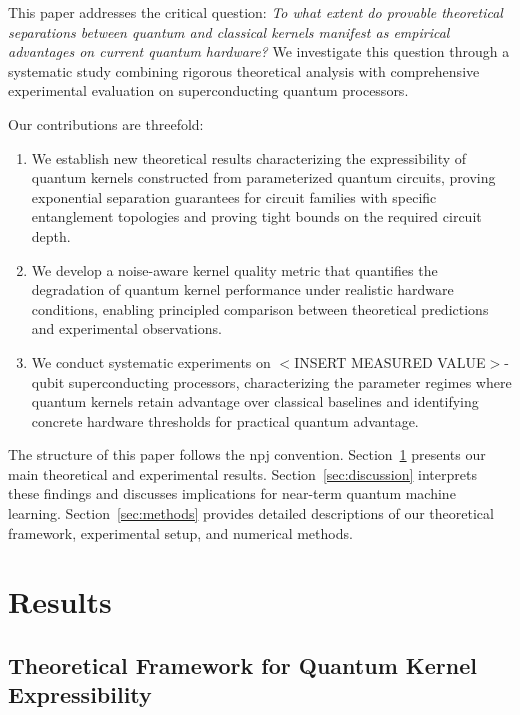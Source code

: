 \documentclass[aps,prb,reprint,superscriptaddress,showpacs]{revtex4-2}
\begin{document}
This paper addresses the critical question: \emph{To what extent do provable theoretical separations between quantum and classical kernels manifest as empirical advantages on current quantum hardware?} We investigate this question through a systematic study combining rigorous theoretical analysis with comprehensive experimental evaluation on superconducting quantum processors.

Our contributions are threefold:
\begin{enumerate}[label=(\roman*)]
    \item We establish new theoretical results characterizing the expressibility of quantum kernels constructed from parameterized quantum circuits, proving exponential separation guarantees for circuit families with specific entanglement topologies and proving tight bounds on the required circuit depth.
    \item We develop a noise-aware kernel quality metric that quantifies the degradation of quantum kernel performance under realistic hardware conditions, enabling principled comparison between theoretical predictions and experimental observations.
    \item We conduct systematic experiments on $<$INSERT MEASURED VALUE$>$-qubit superconducting processors, characterizing the parameter regimes where quantum kernels retain advantage over classical baselines and identifying concrete hardware thresholds for practical quantum advantage.
\end{enumerate}

The structure of this paper follows the npj convention. Section~\ref{sec:results} presents our main theoretical and experimental results. Section~\ref{sec:discussion} interprets these findings and discusses implications for near-term quantum machine learning. Section~\ref{sec:methods} provides detailed descriptions of our theoretical framework, experimental setup, and numerical methods.


\section{Results}
\label{sec:results}

\subsection{Theoretical Framework for Quantum Kernel Expressibility}
\end{document}
